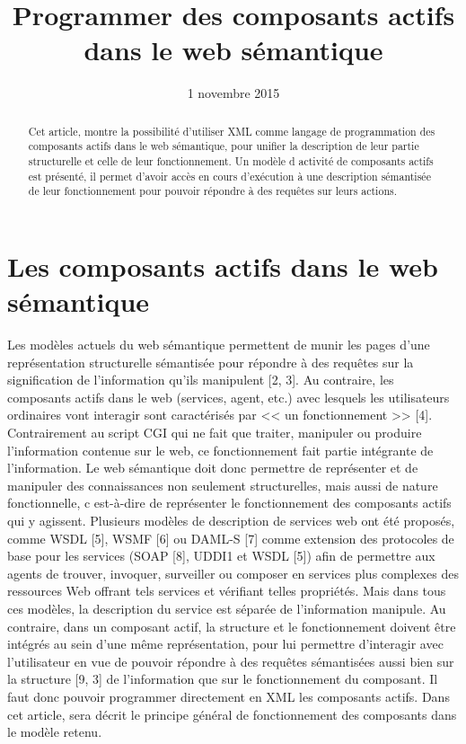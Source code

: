 \documentclass[a4 paper, 10 pt]{article}
\title{Programmer des composants actifs dans le web sémantique}
\date {1 novembre 2015}
\begin{document}
	
\maketitle




\begin{abstract}
Cet article, montre la possibilité d'utiliser XML 
\cite{CRSHG}comme langage de programmation des composants actifs dans le web sémantique, pour unifier la description de leur partie structurelle et celle de leur fonctionnement. Un modèle d activité de composants actifs est présenté, il permet d'avoir accès en cours d'exécution  à une description sémantisée de leur fonctionnement pour pouvoir répondre à des requêtes sur leurs actions.

\end{abstract}

\section{Les composants actifs dans le web sémantique}
 

Les modèles actuels du web sémantique permettent de munir les pages d'une représentation structurelle sémantisée pour répondre à des requêtes sur la signification de l'information qu'ils manipulent [2, 3]. Au contraire, les composants actifs dans le web (services, agent, etc.) avec lesquels les utilisateurs ordinaires vont interagir sont caractérisés par << un fonctionnement >> [4]. Contrairement au  script CGI  qui ne fait que traiter, manipuler ou produire l'information contenue sur le web, ce fonctionnement fait partie intégrante de l'information. Le web sémantique doit donc permettre de représenter et de manipuler des connaissances non seulement structurelles, mais aussi de nature fonctionnelle, c est-à-dire de représenter le fonctionnement des composants actifs qui y agissent. Plusieurs modèles de description de services web ont été proposés, comme WSDL [5], WSMF [6] ou DAML-S [7] comme extension des protocoles de base pour les services (SOAP [8], UDDI1 et WSDL [5]) afin de permettre aux agents de trouver, invoquer, surveiller ou composer en services plus complexes des ressources Web offrant tels services et vérifiant telles propriétés. Mais dans tous ces modèles, la description du service est séparée de l'information manipule. Au contraire, dans un composant actif, la structure et le fonctionnement doivent être intégrés au sein d'une même représentation, pour lui permettre d'interagir avec l'utilisateur en vue de pouvoir répondre à des requêtes sémantisées aussi bien sur la structure [9, 3] de l'information que sur le fonctionnement  du composant. Il faut donc pouvoir programmer directement en XML les composants actifs. Dans cet article, sera décrit  le principe général de fonctionnement des composants dans le modèle retenu.
\end{document}
